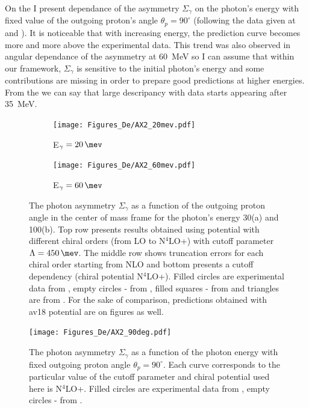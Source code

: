      On the  I present dependance of the asymmetry
     $\Sigma_\gamma$ on the photon's energy with fixed value
     of the outgoing proton's angle $\theta_p = 90^\circ$ 
     (following the data given at \cite{delbianco_1981} and \cite{depascale_asymmetry}).
     It is noticeable that with increasing energy, the prediction curve
     becomes more and more above the experimental data. This trend
     was also observed in angular dependance of the asymmetry at 60~MeV
     so I can assume that within our framework, 
     $\Sigma_\gamma$ is sensitive to the initial photon's energy and some 
     contributions are missing in order to prepare good predictions
     at higher energies. From the  we can say that
     large descripancy with data starts appearing after 
     35~MeV. 

    \begin{figure}[h]
        \centering
        \begin{subfigure}[b]{0.46\textwidth}
            \texttt{[image: Figures\_De/AX2\_20mev.pdf]}
            \caption{\small E$_\gamma = \SI{20}{\mev}$}
            \label{AX_20_vert}
        \end{subfigure}
        \begin{subfigure}[b]{0.46\textwidth}
            \texttt{[image: Figures\_De/AX2\_60mev.pdf]}
            \caption{\small E$_\gamma = \SI{60}{\mev}$}
            \label{AX_60_vert}
        \end{subfigure}
        \caption{The photon asymmetry $\Sigma_\gamma$ 
        as a function of the outgoing proton angle in the center of mass frame 
        for the photon's energy \SI{30}{\mev}(a) and \SI{100}{\mev}(b).
        Top row presents results obtained using potential
        with different chiral orders (from LO to N$^4$LO+) with cutoff parameter $\Lambda=\SI{450}{\mev}$.
        The middle row shows truncation errors for each 
        chiral order starting from NLO and
        bottom presents a cutoff dependency (chiral potential N$^4$LO+).
        Filled circles are experimental data from \cite{KRAUSE1992_asymetry},
        empty circles - from \cite{depascale_asymmetry}, filled squares
        - from \cite{Barannik_asymetry} and triangles are from \cite{Vnukov_asymmetry}.
        For the sake of comparison, predictions obtained with \gls*{av18} potential are on  figures as well.}
        \label{assymetry}
    \end{figure}
     
    \begin{figure}[h]
        \begin{center}
        \texttt{[image: Figures\_De/AX2\_90deg.pdf]}
        \end{center}
        \caption{The photon asymmetry $\Sigma_\gamma$ 
        as a function of the photon energy  
        with fixed outgoing proton angle $\theta_p=90^\circ$.
        Each curve corresponds to the particular value of the cutoff parameter
        and chiral potential used here is N$^4$LO+.
        Filled circles are experimental data from \cite{delbianco_1981},
        empty circles - from \cite{depascale_asymmetry}.}
        \label{asymmetry_90deg}
    \end{figure}
    

